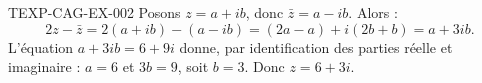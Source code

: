 \begin{corrige}{TEXP-CAG-EX-002}
Posons $z=a+ib$, donc $\bar z=a-ib$. Alors :
\[
  2z-\bar z = 2(a+ib)-(a-ib) = (2a-a)+i(2b+b) = a+3ib.
\]
L'équation $a+3ib=6+9i$ donne, par identification des parties réelle et imaginaire : $a=6$ et $3b=9$, soit $b=3$. Donc $z=6+3i$.
\end{corrige}
